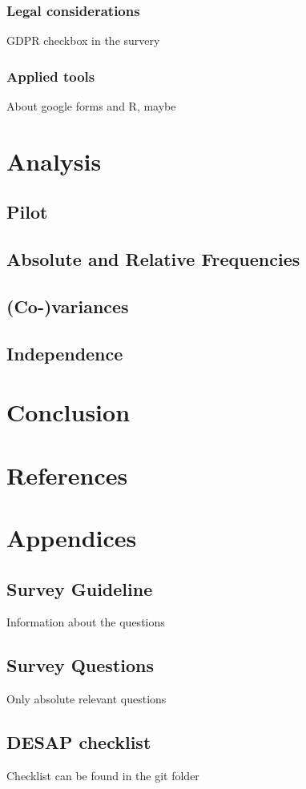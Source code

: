 \documentclass[12pt,a4paper,paper=a4,oneside,titlepage,pdftex]{scrartcl}
\begin{document}
\subsubsection{Legal considerations}
GDPR checkbox in the survery

\subsubsection{Applied tools}
About google forms and R, maybe

\section{Analysis}

\subsection{Pilot}

\subsection{Absolute and Relative Frequencies}

\subsection{(Co-)variances}

\subsection{Independence}

\section{Conclusion}

\section*{References}

\renewcommand\refname{\vskip -1cm}


\section*{Appendices}

\subsection*{Survey Guideline}
Information about the questions

\subsection*{Survey Questions}
Only absolute relevant questions

\subsection*{DESAP checklist}
Checklist can be found in the git folder
\end{document}
